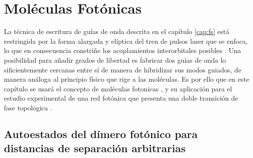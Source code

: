 \chapter{Moléculas Fotónicas}

La técnica de escritura de guías de onda descrita en el capítulo \ref{cap:fs} está restringida por la forma alargada y elíptica del tren de pulsos laser que se enfoca, lo que en consecuencia constriñe los acoplamientos interorbitales posibles \citep{interorbital}. Una posibilidad para añadir grados de libertad es fabricar dos guías de onda lo sificientemente cercanas entre sí de manera de hibridizar sus modos guiados, de manera análoga al principio físico que rige a las moléculas. Es por ello que en este capítulo se usará el concepto de moléculas fotonicas \citep{molecules}, y su aplicación para el estudio experimental de una red fotónica que presenta una doble transición de fase topológica \citep{SPSSH}.

\section{Autoestados del dímero fotónico para distancias de separación arbitrarias}

